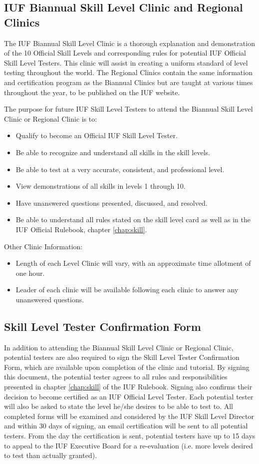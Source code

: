 \subsection{IUF Biannual Skill Level Clinic and Regional Clinics}
The IUF Biannual Skill Level Clinic is a thorough explanation and demonstration of the 10 Official Skill Levels and corresponding rules for potential IUF Official Skill Level Testers.
This clinic will assist in creating a uniform standard of level testing throughout the world.
The Regional Clinics contain the same information and certification program as the Biannual Clinics but are taught at various times throughout the year, to be published on the IUF website.

The purpose for future IUF Skill Level Testers to attend the Biannual Skill Level Clinic or Regional Clinic is to:
\begin{itemize}
\item Qualify to become an Official IUF Skill Level Tester.
\item Be able to recognize and understand all skills in the skill levels.
\item Be able to test at a very accurate, consistent, and professional level.
\item View demonstrations of all skills in levels 1 through 10.
\item Have unanswered questions presented, discussed, and resolved.
\item Be able to understand all rules stated on the skill level card as well as in the IUF Official Rulebook, chapter \ref{chap:skill}.
\end{itemize}
Other Clinic Information:
\begin{itemize}
\item Length of each Level Clinic will vary, with an approximate time allotment of one hour.
\item Leader of each clinic will be available following each clinic to answer any unanswered questions.
\end{itemize}

\subsection{Skill Level Tester Confirmation Form}
In addition to attending the Biannual Skill Level Clinic or Regional Clinic, potential testers are also required to sign the Skill Level Tester Confirmation Form, which are available upon completion of the clinic and tutorial.
By signing this document, the potential tester agrees to all rules and responsibilities presented in chapter \ref{chap:skill} of the IUF Rulebook.
Signing also confirms their decision to become certified as an IUF Official Level Tester.
Each potential tester will also be asked to state the level he/she desires to be able to test to.
All completed forms will be examined and considered by the IUF Skill Level Director and within 30 days of signing, an email certification will be sent to all potential testers.
From the day the certification is sent, potential testers have up to 15 days to appeal to the IUF Executive Board for a re-evaluation (i.e. more levels desired to test than actually granted).

